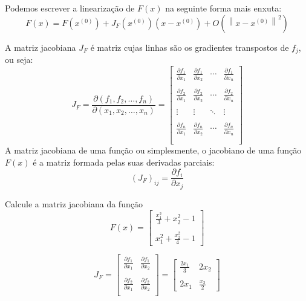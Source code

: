 Podemos escrever a linearização de $F(x)$ na seguinte forma mais enxuta:
\begin{equation} F(x)=F\left(x^{(0)}\right)+ J_F(x^{(0)})\left(x-x^{(0)}\right) + O\left(\left\|x-x^{(0)}\right\|^2\right)  \end{equation}

A matriz jacobiana $J_F$ é matriz cujas linhas são os gradientes transpostos de $f_j$, ou seja:
\begin{equation}J_F= \frac{\partial(f_1,f_2,\ldots,f_n)}{\partial(x_1,x_2,\ldots,x_n)}=\left[
\begin{array}{ccccc}
\frac{\partial f_1}{\partial x_1}&\frac{\partial f_1}{\partial x_2}&\cdots&\frac{\partial f_1}{\partial x_n}\\~\\
\frac{\partial f_2}{\partial x_1}&\frac{\partial f_2}{\partial x_2}&\cdots&\frac{\partial f_2}{\partial x_n}\\~\\
\vdots&\vdots&\ddots&\vdots\\~\\
\frac{\partial f_n}{\partial x_1}&\frac{\partial f_n}{\partial x_2}&\cdots&\frac{\partial f_n}{\partial x_n}\\~\\
\end{array}
\right]
\end{equation}
A matriz jacobiana de uma função ou simplesmente, o jacobiano de uma função $F(x)$ é a matriz formada pelas suas derivadas parciais:
\begin{equation} \left(J_F\right)_{ij}=\frac{\partial f_i}{\partial x_j} \end{equation}


\begin{ex} Calcule a matriz jacobiana da função
\begin{equation}F(x)=\left[
\begin{array}{c}
\frac{x_1^2}{3}+x_2^2-1\\~\\
x_1^2+\frac{x_2^2}{4}-1
\end{array}
\right]\end{equation}

\begin{equation}J_F=\left[
\begin{array}{cc}
\frac{\partial f_1}{\partial x_1} & \frac{\partial f_1}{\partial x_2}\\~\\
\frac{\partial f_2}{\partial x_1} & \frac{\partial f_2}{\partial x_2}\\
\end{array}
\right]=\left[
\begin{array}{cc}
\frac{2x_1}{3} & 2x_2\\~\\
2x_1&\frac{x_2}{2}
\end{array}
\right]
\end{equation}
\end{ex}

%
